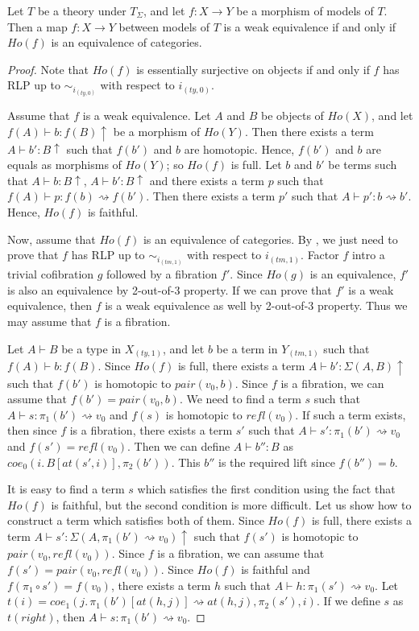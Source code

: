 \documentclass[reqno]{amsart}
\theoremstyle{definition}
\theoremstyle{remark}
\newcommand{\idtype}{\rightsquigarrow}
\numberwithin{figure}{section}
\begin{document}
\begin{prop}[sigma-we-ho]
Let $T$ be a theory under $T_\Sigma$, and let $f : X \to Y$ be a morphism of models of $T$.
Then a map $f : X \to Y$ between models of $T$ is a weak equivalence if and only if $Ho(f)$ is an equivalence of categories.
\end{prop}
\begin{proof}
Note that $Ho(f)$ is essentially surjective on objects if and only if $f$ has RLP up to $\sim_{i_{(ty,0)}}$ with respect to $i_{(ty,0)}$.

Assume that $f$ is a weak equivalence.
Let $A$ and $B$ be objects of $Ho(X)$, and let $f(A) \vdash b : f(B)\!\uparrow$ be a morphism of $Ho(Y)$.
Then there exists a term $A \vdash b' : B\!\uparrow$ such that $f(b')$ and $b$ are homotopic.
Hence, $f(b')$ and $b$ are equals as morphisms of $Ho(Y)$; so $Ho(f)$ is full.
Let $b$ and $b'$ be terms such that $A \vdash b : B\!\uparrow$, $A \vdash b' : B\!\uparrow$ and there exists a term $p$ such that $f(A) \vdash p : f(b) \idtype f(b')$.
Then there exists a term $p'$ such that $A \vdash p' : b \idtype b'$.
Hence, $Ho(f)$ is faithful.

Now, assume that $Ho(f)$ is an equivalence of categories.
By , we just need to prove that $f$ has RLP up to $\sim_{i_{(tm,1)}}$ with respect to $i_{(tm,1)}$.
Factor $f$ intro a trivial cofibration $g$ followed by a fibration $f'$.
Since $Ho(g)$ is an equivalence, $f'$ is also an equivalence by 2-out-of-3 property.
If we can prove that $f'$ is a weak equivalence, then $f$ is a weak equivalence as well by 2-out-of-3 property.
Thus we may assume that $f$ is a fibration.

Let $A \vdash B$ be a type in $X_{(ty,1)}$, and let $b$ be a term in $Y_{(tm,1)}$ such that $f(A) \vdash b : f(B)$.
Since $Ho(f)$ is full, there exists a term $A \vdash b' : \Sigma(A,B)\!\uparrow$ such that $f(b')$ is homotopic to $pair(v_0,b)$.
Since $f$ is a fibration, we can assume that $f(b') = pair(v_0,b)$.
We need to find a term $s$ such that $A \vdash s : \pi_1(b') \idtype v_0$ and $f(s)$ is homotopic to $refl(v_0)$.
If such a term exists, then since $f$ is a fibration, there exists a term $s'$ such that $A \vdash s' : \pi_1(b') \idtype v_0$ and $f(s') = refl(v_0)$.
Then we can define $A \vdash b'' : B$ as $coe_0(i.\,B[at(s',i)], \pi_2(b'))$.
This $b''$ is the required lift since $f(b'') = b$.

It is easy to find a term $s$ which satisfies the first condition using the fact that $Ho(f)$ is faithful, but the second condition is more difficult.
Let us show how to construct a term which satisfies both of them.
Since $Ho(f)$ is full, there exists a term $A \vdash s' : \Sigma(A, \pi_1(b') \idtype v_0)\!\uparrow$ such that $f(s')$ is homotopic to $pair(v_0, refl(v_0))$.
Since $f$ is a fibration, we can assume that $f(s') = pair(v_0, refl(v_0))$.
Since $Ho(f)$ is faithful and $f(\pi_1 \circ s') = f(v_0)$, there exists a term $h$ such that $A \vdash h : \pi_1(s') \idtype v_0$.
Let $t(i) = coe_1(j.\,\pi_1(b')[at(h,j)] \idtype at(h,j), \pi_2(s'), i)$.
If we define $s$ as $t(right)$, then $A \vdash s : \pi_1(b') \idtype v_0$.


\end{proof}
\end{document}
